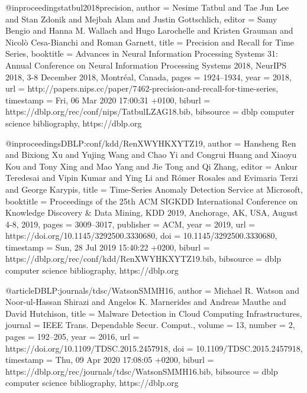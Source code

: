 @inproceedings{tatbul2018precision,
   author    = {Nesime Tatbul and
               Tae Jun Lee and
               Stan Zdonik and
               Mejbah Alam and
               Justin Gottschlich},
  editor    = {Samy Bengio and
               Hanna M. Wallach and
               Hugo Larochelle and
               Kristen Grauman and
               Nicol{\`{o}} Cesa{-}Bianchi and
               Roman Garnett},
  title     = {Precision and Recall for Time Series},
  booktitle = {Advances in Neural Information Processing Systems 31: Annual Conference
               on Neural Information Processing Systems 2018, NeurIPS 2018, 3-8 December
               2018, Montr{\'{e}}al, Canada},
  pages     = {1924--1934},
  year      = {2018},
  url       = {http://papers.nips.cc/paper/7462-precision-and-recall-for-time-series},
  timestamp = {Fri, 06 Mar 2020 17:00:31 +0100},
  biburl    = {https://dblp.org/rec/conf/nips/TatbulLZAG18.bib},
  bibsource = {dblp computer science bibliography, https://dblp.org}
}

@inproceedings{DBLP:conf/kdd/RenXWYHKXYTZ19,
  author    = {Hansheng Ren and
               Bixiong Xu and
               Yujing Wang and
               Chao Yi and
               Congrui Huang and
               Xiaoyu Kou and
               Tony Xing and
               Mao Yang and
               Jie Tong and
               Qi Zhang},
  editor    = {Ankur Teredesai and
               Vipin Kumar and
               Ying Li and
               R{\'{o}}mer Rosales and
               Evimaria Terzi and
               George Karypis},
  title     = {Time-Series Anomaly Detection Service at Microsoft},
  booktitle = {Proceedings of the 25th {ACM} {SIGKDD} International Conference on
               Knowledge Discovery {\&} Data Mining, {KDD} 2019, Anchorage, AK,
               USA, August 4-8, 2019},
  pages     = {3009--3017},
  publisher = {{ACM}},
  year      = {2019},
  url       = {https://doi.org/10.1145/3292500.3330680},
  doi       = {10.1145/3292500.3330680},
  timestamp = {Sun, 28 Jul 2019 15:40:22 +0200},
  biburl    = {https://dblp.org/rec/conf/kdd/RenXWYHKXYTZ19.bib},
  bibsource = {dblp computer science bibliography, https://dblp.org}
}

@article{DBLP:journals/tdsc/WatsonSMMH16,
  author    = {Michael R. Watson and
               Noor{-}ul{-}Hassan Shirazi and
               Angelos K. Marnerides and
               Andreas Mauthe and
               David Hutchison},
  title     = {Malware Detection in Cloud Computing Infrastructures},
  journal   = {{IEEE} Trans. Dependable Secur. Comput.},
  volume    = {13},
  number    = {2},
  pages     = {192--205},
  year      = {2016},
  url       = {https://doi.org/10.1109/TDSC.2015.2457918},
  doi       = {10.1109/TDSC.2015.2457918},
  timestamp = {Thu, 09 Apr 2020 17:08:05 +0200},
  biburl    = {https://dblp.org/rec/journals/tdsc/WatsonSMMH16.bib},
  bibsource = {dblp computer science bibliography, https://dblp.org}
}

